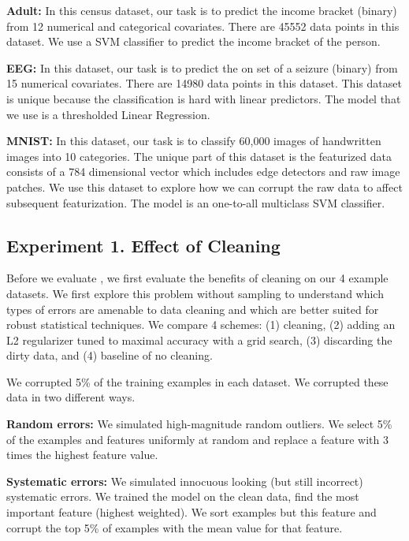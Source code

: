 \noindent\textbf{Adult: } In this census dataset, our task is to predict the income bracket (binary) from 12 numerical and categorical covariates. There are 45552 data points in this dataset. We use a SVM classifier to predict the income bracket of the person.

\noindent\textbf{EEG: } In this dataset, our task is to predict the on set of a seizure (binary) from 15 numerical covariates. There are 14980 data points in this dataset. This dataset is unique because the classification is hard with linear predictors. The model that we use is a thresholded Linear Regression.

\noindent\textbf{MNIST: } In this dataset, our task is to classify 60,000 images of handwritten images into 10 categories. The unique part of this dataset is the featurized data consists of a 784 dimensional vector which includes edge detectors and raw image patches. We use this dataset to explore how we can corrupt the raw data to affect subsequent featurization. The model is an one-to-all multiclass SVM classifier. 

\subsection{Experiment 1. Effect of Cleaning}
Before we evaluate \sys, we first evaluate the benefits of cleaning on our 4 example datasets.
We first explore this problem without sampling to understand which types of errors are amenable to data cleaning and which are better suited for robust statistical techniques.
We compare 4 schemes: (1) cleaning, (2) adding an L2 regularizer tuned to maximal accuracy with a grid search, (3) discarding the dirty data, and (4) baseline of no cleaning.

We corrupted 5\% of the training examples in each dataset.
We corrupted these data in two different ways.

\noindent\textbf{Random errors: } We simulated high-magnitude random outliers. We select 5\% of the examples and features uniformly at random and replace a feature with 3 times the highest feature value.

\noindent\textbf{Systematic errors: } We simulated innocuous looking (but still incorrect) systematic errors. We trained the model on the clean data, find the most important feature (highest weighted). We sort examples but this feature and corrupt the top 5\% of examples with the mean value for that feature.

